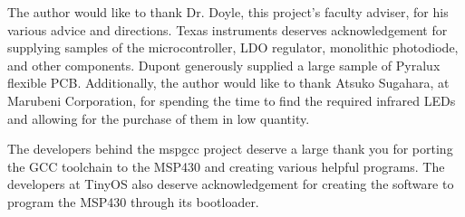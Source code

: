 
The author would like to thank Dr. Doyle, this project's faculty adviser, for his various advice and directions. Texas instruments deserves acknowledgement for supplying samples of the microcontroller, LDO regulator, monolithic photodiode, and other components. Dupont generously supplied a large sample of Pyralux flexible PCB. Additionally, the author would like to thank Atsuko Sugahara, at Marubeni Corporation, for spending the time to find the required infrared LEDs and allowing for the purchase of them in low quantity. 

The developers behind the mspgcc project deserve a large thank you for porting the GCC toolchain to the MSP430 and creating various helpful programs. The developers at TinyOS also deserve acknowledgement for creating the software to program the MSP430 through its bootloader.
